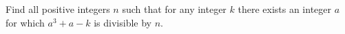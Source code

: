Find all positive integers $n$ such that for any integer $k$ there exists an integer $a$ for which $a^3+a-k$ is divisible by $n$.